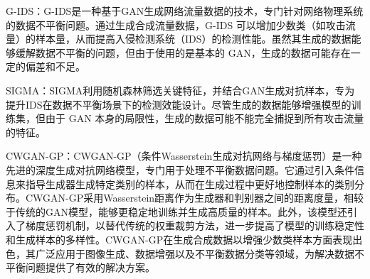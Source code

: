\documentclass[promaster]{thesis-uestc}
\begin{document}
G-IDS：G-IDS是一种基于GAN生成网络流量数据的技术，专门针对网络物理系统的数据不平衡问题。通过生成合成流量数据，G-IDS 可以增加少数类（如攻击流量）的样本量，从而提高入侵检测系统（IDS）的检测性能。虽然其生成的数据能够缓解数据不平衡的问题，但由于使用的是基本的 GAN，生成的数据可能存在一定的偏差和不足。
\begin{table}[h!]
\centering
\caption{数据增强方法对比}
\label{dataAppend}
\end{table}

SIGMA：SIGMA利用随机森林筛选关键特征，并结合GAN生成对抗样本，专为提升IDS在数据不平衡场景下的检测效能设计。尽管生成的数据能够增强模型的训练集，但由于 GAN 本身的局限性，生成的数据可能不能完全捕捉到所有攻击流量的特征。

CWGAN-GP：CWGAN-GP（条件Wasserstein生成对抗网络与梯度惩罚）是一种先进的深度生成对抗网络模型，专门用于处理不平衡数据问题。它通过引入条件信息来指导生成器生成特定类别的样本，从而在生成过程中更好地控制样本的类别分布。CWGAN-GP采用Wasserstein距离作为生成器和判别器之间的距离度量，相较于传统的GAN模型，能够更稳定地训练并生成高质量的样本。此外，该模型还引入了梯度惩罚机制，以替代传统的权重裁剪方法，进一步提高了模型的训练稳定性和生成样本的多样性。CWGAN-GP在生成合成数据以增强少数类样本方面表现出色，其广泛应用于图像生成、数据增强以及不平衡数据分类等领域，为解决数据不平衡问题提供了有效的解决方案。
\end{document}

